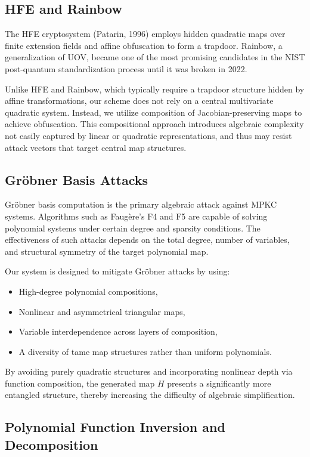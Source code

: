 \documentclass[12pt]{article}
\begin{document}
\subsection*{HFE and Rainbow}

The HFE cryptosystem (Patarin, 1996) employs hidden quadratic maps over finite extension fields and affine obfuscation to form a trapdoor. Rainbow, a generalization of UOV, became one of the most promising candidates in the NIST post-quantum standardization process until it was broken in 2022.

Unlike HFE and Rainbow, which typically require a trapdoor structure hidden by affine transformations, our scheme does not rely on a central multivariate quadratic system. Instead, we utilize composition of Jacobian-preserving maps to achieve obfuscation. This compositional approach introduces algebraic complexity not easily captured by linear or quadratic representations, and thus may resist attack vectors that target central map structures.

\subsection*{Gröbner Basis Attacks}

Gröbner basis computation is the primary algebraic attack against MPKC systems. Algorithms such as Faugère’s F4 and F5 are capable of solving polynomial systems under certain degree and sparsity conditions. The effectiveness of such attacks depends on the total degree, number of variables, and structural symmetry of the target polynomial map.

Our system is designed to mitigate Gröbner attacks by using:
\begin{itemize}
    \item High-degree polynomial compositions,
    \item Nonlinear and asymmetrical triangular maps,
    \item Variable interdependence across layers of composition,
    \item A diversity of tame map structures rather than uniform polynomials.
\end{itemize}

By avoiding purely quadratic structures and incorporating nonlinear depth via function composition, the generated map \( H \) presents a significantly more entangled structure, thereby increasing the difficulty of algebraic simplification.

\subsection*{Polynomial Function Inversion and Decomposition}
\end{document}
